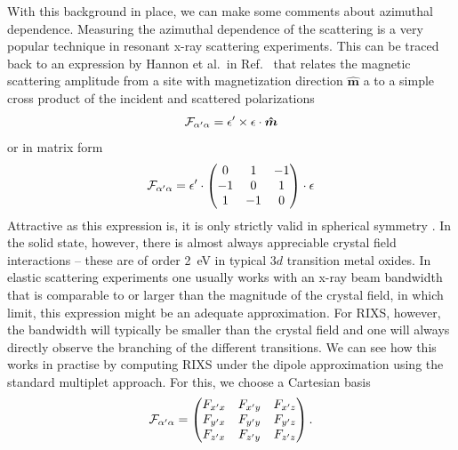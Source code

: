 \documentclass[aps,onecolumn, notitlepage, longbibliography]{revtex4-1}
\begin{document}
With this background in place, we can make some comments about azimuthal dependence. Measuring the azimuthal dependence of the scattering is a very popular technique in resonant x-ray scattering experiments. This can be traced back to an expression by Hannon et al.\ in Ref.~\cite{Hannon1988} that relates the magnetic scattering amplitude from a site with magnetization direction $\bm{\hat{m}}$ a to a simple cross product of the incident and scattered polarizations 
 \begin{equation}
 {\cal F}_{\alpha^\prime\alpha} = \epsilon^\prime \times \epsilon \cdot \bm{\hat{m}}
\end{equation}
or in matrix form
 \begin{equation}
 {\cal F}_{\alpha^\prime\alpha} = \epsilon^\prime \cdot
   \begin{pmatrix}
    0 & 1  & -1  \\
    -1 & 0  & 1  \\
   1 & -1  & 0
  \end{pmatrix} 
 \cdot \epsilon 
 \label{cross_product_matrix}
\end{equation}
Attractive as this expression is, it is only strictly valid in spherical symmetry \cite{Mazzoli2007, Haverkort2010_symmetry, Juhin2014}. In the solid state, however, there is almost always appreciable crystal field interactions -- these are of order 2~eV in typical $3d$ transition metal oxides.  In elastic scattering experiments one usually works with an x-ray beam bandwidth that is comparable to or larger than the magnitude of the crystal field, in which limit, this expression might be an adequate approximation. For RIXS, however, the bandwidth will typically be smaller than the crystal field and one will always directly observe the branching of the different transitions. We can see how this works in practise by computing RIXS under the dipole approximation using the standard multiplet approach. For this, we choose a Cartesian basis
\begin{equation}
 {\cal F}_{\alpha^\prime\alpha} =
  \begin{pmatrix}
    F_{x^\prime x} & F_{x^\prime y}  & F_{x^\prime z}  \\
    F_{y^\prime x} & F_{y^\prime y}  & F_{y^\prime z}  \\
   F_{z^\prime x} & F_{z^\prime y}  & F_{z^\prime z}
  \end{pmatrix} .
\end{equation}
\end{document}

